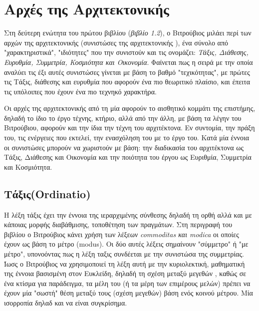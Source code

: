 \section{Αρχές της Αρχιτεκτονικής}

\cite{vitruvius-lefas,lefas-fundamental}

Στη δεύτερη ενώτητα του πρώτου βιβλίου (\emph{βιβλίο 1.2}), ο Βιτρούβιος μιλάει περί των αρχών της αρχιτεκτονικής (συνιστώσες της αρχιτεκτονικής \cite{vitruvius-lefas}), ένα σύνολο από "χαρακτηριστικά", "ιδιότητες" που την συνιστούν και τις ονομάζει: \emph{Τάξις, Διάθεσης, Ευρυθμία, Συμμετρία, Κοσμιότητα και Οικονομία}. Φαίνεται πως η σειρά με την οποία αναλύει τις έξι αυτές συνιστώσες γίνεται με βάση το βαθμό "τεχικότητας", με πρώτες τις Τάξις, διάθεσης και ευρυθμία που αφορούν ένα πιο θεωριτικό πλαίσιο, και έπειτα τις υπόλοιπες που έχουν ένα πιο τεχνηκό χαρακτήρα. \cite[σ.~49,91-92]{vitruvius-lefas}
 
Οι αρχές της αρχιτεκτονικής από τη μία αφορούν το αισθητικό κομμάτι της επιστήμης, δηλαδή το ίδιο το έργο τέχνης, κτήριο, αλλά από την άλλη, με βάση τα λέγην του Βιτρούβιου, αφορούν και την ίδια την τέχνη του αρχιτέκτονα. Εν συντομία, την πράξη του, τις ενέργειες που εκτελεί, την ενασχόληση του με το έργο του. Κατά μία έννοια οι συνιστώσες μπορούν να χωριστούν με βάση: την διαδικασία του αρχιτέκτονα ως Τάξις, Διάθεσης και Οικονομία και την ποιότητα του έργου ως Ευριθμία, Συμμετρία και Κοσμιότητα.


 
\subsection{Τάξις(Ordinatio)}
  
Η λέξη τάξις έχει την έννοια της ιεραρχιμένης σύνθεσης δηλαδή τη ορθή αλλά και με κάποιας μορφής διαβάθμισης, τοποθέτηση των πραγμάτων. \cite[σ.~92]{vitruvius-lefas} Στη περιγραφή του βιβλίου ο Βιτρούβιος κάνει χρήση των λέξεων \emph{commoditas και modica} οι οποίες έχουν ως βάση το μέτρο (modus). Οι δύο αυτές λέξεις σημαίνουν "σύμμετρο" ή "με μέτρο", υπονοόντας πως η λέξη ταξις συνδέεται με την συνιστώσα της συμμετρίας. Ίωσς ο Βιτρούβιος να χρησιμοποιεί τη λέξη αυτή με την κυριολεκτική, μαθηματική της έννοια βασισμένη στον Ευκλείδη, δηλαδή τη σχέση μεταξύ μεγεθών \cite[σ.~186]{lefas-fundamental}, καθώς σε ένα κτίσμα για παράδειγμα, τα μέλη του (ή τα μέρη των επιμέρους μελών) πρέπει να έχουν μία "σωστή" θέση μεταξύ τους (σχέση μεγεθών) βάση ενός κοινού μέτρου. Μία ισορροπία δηλαδ και να είναι συγκρίσημα.\cite[σ.~92]{vitruvius-lefas}

